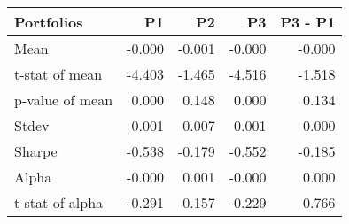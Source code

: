 \begin{tabular}{lrrrr}
\toprule
Portfolios & P1 & P2 & P3 & P3 - P1 \\
\midrule
Mean & -0.000 & -0.001 & -0.000 & -0.000 \\
t-stat of mean & -4.403 & -1.465 & -4.516 & -1.518 \\
p-value of mean & 0.000 & 0.148 & 0.000 & 0.134 \\
Stdev & 0.001 & 0.007 & 0.001 & 0.000 \\
Sharpe & -0.538 & -0.179 & -0.552 & -0.185 \\
Alpha & -0.000 & 0.001 & -0.000 & 0.000 \\
t-stat of alpha & -0.291 & 0.157 & -0.229 & 0.766 \\
\bottomrule
\end{tabular}
